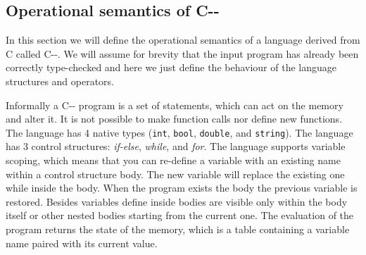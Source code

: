 \subsection{Operational semantics of C-{}-}
\label{sec:semantics}
In this section we will define the operational semantics of a language derived from C called C-{}-. We will assume for brevity that the input program has already been correctly type-checked and here we just define the behaviour of the language structures and operators.

Informally a C-{}- program is a set of statements, which can act on the memory and alter it. It is not possible to make function calls nor define new functions. The language has 4 native types (\texttt{int}, \texttt{bool}, \texttt{double}, and \texttt{string}). The language has 3 control structures: \textit{if-else}, \textit{while}, and \textit{for}. The language supports variable scoping, which means that you can re-define a variable with an existing name within a control structure body. The new variable will replace the existing one while inside the body. When the program exists the body the previous variable is restored. Besides variables define inside bodies are visible only within the body itself or other nested bodies starting from the current one. The evaluation of the program returns the state of the memory, which is a table containing a variable name paired with its current value.

